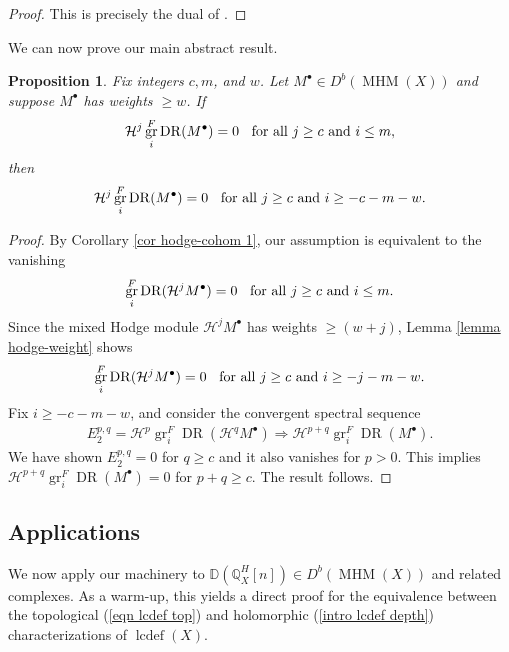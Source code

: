 \documentclass[11pt]{amsart}
\newtheorem{proposition}[equation]{Proposition}
\theoremstyle{definition}
\theoremstyle{plain}
\newcounter{intro}
\DeclareMathOperator{\gr}{gr}
\DeclareMathOperator{\MHM}{MHM}
\DeclareMathOperator{\dr}{DR}
\DeclareMathOperator{\lcdef}{lcdef}
\begin{document}
\begin{proof}
This is precisely the dual of \cite[Proposition $5.2$]{popa park lefschetz}. 
\end{proof}

We can now prove our main abstract result.

\begin{proposition}\label{prop main}
Fix integers $c, m$, and $w$. Let $M^\bullet \in D^b(\MHM(X))$ and suppose $M^\bullet$ has weights $\geq w$. If
\begin{align*}
    \mathcal{H}^j \gr_i^F \dr(M^\bullet) = 0 \hspace{.2cm} \text{ for all } j \geq c \text{ and } i \leq m,
\end{align*}
then
\begin{align*}
    \mathcal{H}^j \gr_i^F \dr(M^\bullet) = 0 \hspace{.2cm} \text{ for all } j \geq c \text{ and } i \geq -c-m-w.
\end{align*}
\end{proposition}

\begin{proof}
By Corollary \ref{cor hodge-cohom 1}, our assumption is equivalent to the vanishing
\begin{align*}
    \gr_i^F \dr( \mathcal{H}^j  M^\bullet) = 0 \hspace{.2cm} \text{ for all } j \geq c \text{ and } i \leq m.
\end{align*}
Since the mixed Hodge module $\mathcal{H}^j M^\bullet$ has weights $\geq (w+j)$, Lemma \ref{lemma hodge-weight} shows
\begin{align*}
    \gr_i^F \dr( \mathcal{H}^j M^\bullet) = 0 \hspace{.2cm} \text{ for all } j \geq c \text{ and } i \geq -j-m-w.
\end{align*}
Fix $i \geq -c-m-w$, and consider the convergent spectral sequence
\begin{align*}
    E_2^{p,q} = \mathcal{H}^p \gr_i^F \dr( \mathcal{H}^q  M^\bullet) \Rightarrow \mathcal{H}^{p+q} \gr_i^F \dr(  M^\bullet ).
\end{align*}
We have shown $E_2^{p,q} = 0$ for $q \geq c$ and it also vanishes for $p > 0$. This implies $\mathcal{H}^{p+q} \gr_i^F \dr(  M^\bullet ) = 0$ for $p+q \geq c$. The result follows.
\end{proof}

\subsection{Applications}
We now apply our machinery to $\mathbb{D} (\mathbb{Q}_X^H[n]) \in D^b(\MHM(X))$ and related complexes. As a warm-up, this yields a direct proof for the equivalence between the topological (\ref{eqn lcdef top}) and holomorphic (\ref{intro lcdef depth}) characterizations of $\lcdef(X)$.
\end{document}
